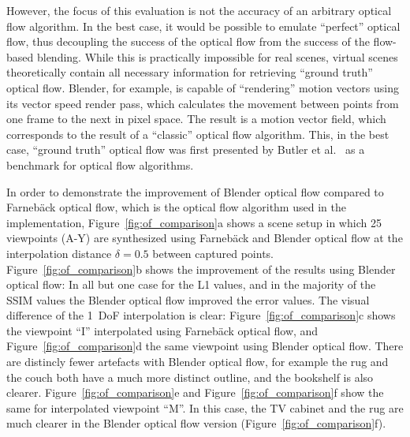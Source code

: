 However, the focus of this evaluation is not the accuracy of an arbitrary optical flow algorithm. In the best case, it would be possible to emulate ``perfect'' optical flow, thus decoupling the success of the optical flow from the success of the flow-based blending. While this is practically impossible for real scenes, virtual scenes theoretically contain all necessary information for retrieving ``ground truth'' optical flow. Blender, for example, is capable of ``rendering'' motion vectors using its vector speed render pass, which calculates the movement between points from one frame to the next in pixel space. The result is a motion vector field, which corresponds to the result of a ``classic'' optical flow algorithm. This, in the best case, ``ground truth'' optical flow was first presented by Butler et al.\ \cite{sintel} as a benchmark for optical flow algorithms.

In order to demonstrate the improvement of Blender optical flow compared to Farneb\"ack optical flow, which is the optical flow algorithm used in the implementation, Figure~\ref{fig:of_comparison}a shows a scene setup in which 25 viewpoints (A-Y) are synthesized using Farneb\"ack and Blender optical flow at the interpolation distance $\delta = 0.5$ between captured points. 
Figure~\ref{fig:of_comparison}b shows the improvement of the results using Blender optical flow: In all but one case for the L1 values, and in the majority of the SSIM values the Blender optical flow improved the error values. The visual difference of the 1~DoF interpolation is clear: Figure~\ref{fig:of_comparison}c shows the viewpoint ``I'' interpolated using Farneb\"ack optical flow, and Figure~\ref{fig:of_comparison}d the same viewpoint using Blender optical flow. There are distincly fewer artefacts with Blender optical flow, for example the rug and the couch both have a much more distinct outline, and the bookshelf is also clearer. Figure~\ref{fig:of_comparison}e and Figure~\ref{fig:of_comparison}f show the same for interpolated viewpoint ``M''. In this case, the TV cabinet and the rug are much clearer in the Blender optical flow version (Figure~\ref{fig:of_comparison}f).

